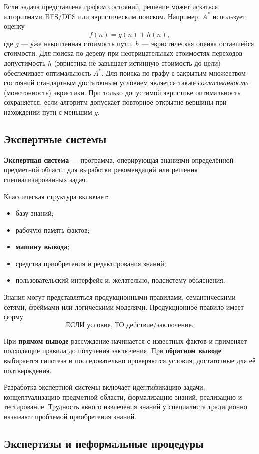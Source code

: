 Если задача представлена графом состояний, решение может искаться алгоритмами BFS/DFS или эвристическим поиском. Например, $A^*$ использует оценку
\[
f(n)=g(n)+h(n),
\]
где $g$ --- уже накопленная стоимость пути, $h$ --- эвристическая оценка оставшейся стоимости. Для поиска по дереву при неотрицательных стоимостях переходов допустимость $h$ (эвристика не завышает истинную стоимость до цели) обеспечивает оптимальность $A^*$. Для поиска по графу с закрытым множеством состояний стандартным достаточным условием является также \emph{согласованность} (монотонность) эвристики. При только допустимой эвристике оптимальность сохраняется, если алгоритм допускает повторное открытие вершины при нахождении пути с меньшим $g$.

\subsection{Экспертные системы}

\textbf{Экспертная система} --- программа, оперирующая знаниями определённой предметной области для выработки рекомендаций или решения специализированных задач.

Классическая структура включает:
\begin{itemize}
\item базу знаний;
\item рабочую память фактов;
\item \textbf{машину вывода};
\item средства приобретения и редактирования знаний;
\item пользовательский интерфейс и, желательно, подсистему объяснения.
\end{itemize}

Знания могут представляться продукционными правилами, семантическими сетями, фреймами или логическими моделями. Продукционное правило имеет форму
\[
\text{ЕСЛИ условие, ТО действие/заключение}.
\]

При \textbf{прямом выводе} рассуждение начинается с известных фактов и применяет подходящие правила до получения заключения. При \textbf{обратном выводе} выбирается гипотеза и последовательно проверяются условия, достаточные для её подтверждения.

Разработка экспертной системы включает идентификацию задачи, концептуализацию предметной области, формализацию знаний, реализацию и тестирование. Трудность явного извлечения знаний у специалиста традиционно называют проблемой приобретения знаний.

\subsection{Экспертизы и неформальные процедуры}

